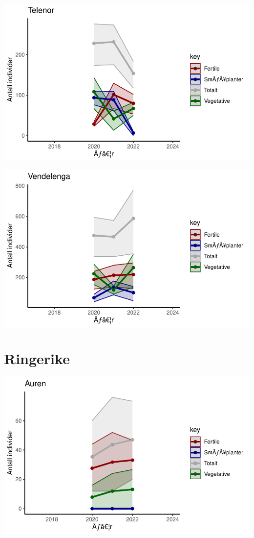 \documentclass[
  letterpaper,
  DIV=11,
  numbers=noendperiod]{scrreport}
\begin{document}
\includegraphics{localEst_files/figure-pdf/unnamed-chunk-4-11.pdf}

\includegraphics{localEst_files/figure-pdf/unnamed-chunk-4-12.pdf}

\hypertarget{ringerike}{%
\section{Ringerike}\label{ringerike}}

\includegraphics{localEst_files/figure-pdf/unnamed-chunk-5-1.pdf}
\end{document}
